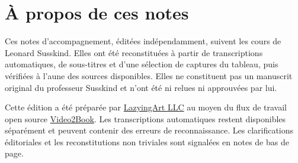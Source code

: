 \documentclass[11pt,oneside]{book}
\begin{document}
\frontmatter
\hypersetup{pageanchor=false}

\hypersetup{pageanchor=true}

\clearpage
\chapter{À propos de ces notes}
Ces notes d’accompagnement, éditées indépendamment, suivent les cours de Leonard Susskind. Elles ont été reconstituées à partir de transcriptions automatiques, de sous-titres et d’une sélection de captures du tableau, puis vérifiées à l’aune des sources disponibles. Elles ne constituent pas un manuscrit original du professeur Susskind et n’ont été ni relues ni approuvées par lui.

Cette édition a été préparée par \href{https://lazying.art}{LazyingArt LLC} au moyen du flux de travail open source \href{https://github.com/lachlanchen/Video2Book}{Video2Book}. Les transcriptions automatiques restent disponibles séparément et peuvent contenir des erreurs de reconnaissance. Les clarifications éditoriales et les reconstitutions non triviales sont signalées en notes de bas de page.
\clearpage
\tableofcontents
\mainmatter










\end{document}
